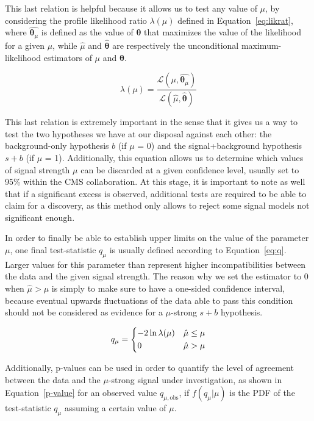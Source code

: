 \documentclass[a4paper, 10pt, openright]{report}
\begin{document}
This last relation is helpful because it allows us to test any value of $\mu$, by considering the profile likelihood ratio $\lambda(\mu)$ defined in Equation~\ref{eq:likrat}, where $\hat{\bm \theta_\mu}$ is defined as the value of $\bm \theta$ that maximizes the value of the likelihood for a given $\mu$, while $\hat{\mu}$ and $\hat{\bm \theta}$ are respectively the unconditional maximum-likelihood estimators of $\mu$ and $\bm \theta$.

\begin{equation}
\label{eq:likrat}
\lambda(\mu) = \frac{\mathcal{L}(\mu, \hat{\bm \theta_\mu})}{\mathcal{L}(\hat{\mu}, \hat{\bm \theta})} 
\end{equation}

This last relation is extremely important in the sense that it gives us a way to test the two hypotheses we have at our disposal against each other: the background-only hypothesis $b$ (if $\mu$ = 0) and the signal+background hypothesis $s + b$ (if $\mu$ = 1). Additionally, this equation allows us to determine which values of signal strength $\mu$ can be discarded at a given confidence level, usually set to 95\% within the \ac{CMS} collaboration. At this stage, it is important to note as well that if a significant excess is observed, additional tests are required to be able to claim for a discovery, as this method only allows to reject some signal models not significant enough.

In order to finally be able to establish upper limits on the value of the parameter $\mu$, one final test-statistic $q_\mu$ is usually defined according to Equation~\ref{eq:q}. Larger values for this parameter than represent higher incompatibilities between the data and the given signal strength. The reason why we set the estimator to 0 when $\hat{\mu} > \mu$ is simply to make sure to have a one-sided confidence interval, because eventual upwards fluctuations of the data able to pass this condition should not be considered as evidence for a $\mu$-strong $s+b$ hypothesis.

\begin{equation}
\label{eq:q}
q_\mu = 
\begin{dcases}
-2 \ln \lambda(\mu) & \hat{\mu} \leq \mu \\
0 & \hat{\mu} > \mu
\end{dcases}
\end{equation}

Additionally, p-values can be used in order to quantify the level of agreement between the data and the $\mu$-strong signal under investigation, as shown in Equation~\ref{p-value} for an observed value $q_{\mu, \text{obs}}$, if $f(q_\mu|\mu)$ is the \ac{PDF} of the test-statistic $q_\mu$ assuming a certain value of $\mu$.
\end{document}
